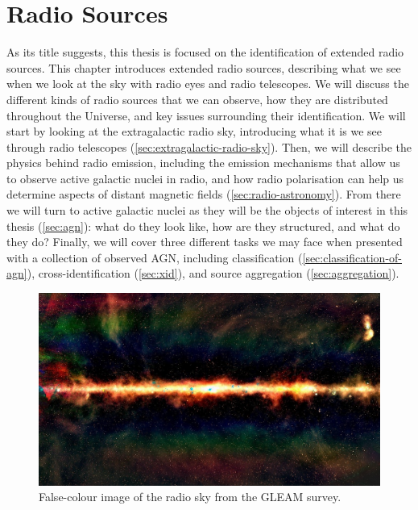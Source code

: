 \chapter{Radio Sources}
\label{cha:background}

    As its title suggests, this thesis is focused on the identification of extended radio sources. This chapter introduces extended radio sources, describing what we see when we look at the sky with radio eyes and radio telescopes. We will discuss the different kinds of radio sources that we can observe, how they are distributed throughout the Universe, and key issues surrounding their identification. We will start by looking at the extragalactic radio sky, introducing what it is we see through radio telescopes (\autoref{sec:extragalactic-radio-sky}). Then, we will describe the physics behind radio emission, including the emission mechanisms that allow us to observe active galactic nuclei in radio, and how radio polarisation can help us determine aspects of distant magnetic fields (\autoref{sec:radio-astronomy}). From there we will turn to active galactic nuclei as they will be the objects of interest in this thesis (\autoref{sec:agn}): what do they look like, how are they structured, and what do they do? Finally, we will cover three different tasks we may face when presented with a collection of observed AGN, including classification (\autoref{sec:classification-of-agn}), cross-identification (\autoref{sec:xid}), and source aggregation (\autoref{sec:aggregation}).

    \begin{figure}[ht]
        \includegraphics[width=\textwidth]{images/gleam.jpg}
        \caption[False-colour image of the radio sky from the GLEAM survey.]{\label{fig:gleam} False-colour image of the radio sky from the GLEAM survey. \citep[Image: Natasha Hurley-Walker, Curtin University/ICRAR;][]{hurley-walker_galactic_2017}}
    \end{figure}

